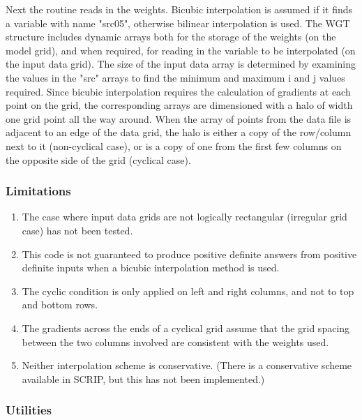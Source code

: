 \documentclass[../main/NEMO_manual]{subfiles}
\begin{document}
Next the routine reads in the weights.
Bicubic interpolation is assumed if it finds a variable with name "src05", otherwise bilinear interpolation is used.
The WGT structure includes dynamic arrays both for the storage of the weights (on the model grid),
and when required, for reading in the variable to be interpolated (on the input data grid).
The size of the input data array is determined by examining the values in the "src" arrays to
find the minimum and maximum i and j values required.
Since bicubic interpolation requires the calculation of gradients at each point on the grid,
the corresponding arrays are dimensioned with a halo of width one grid point all the way around.
When the array of points from the data file is adjacent to an edge of the data grid,
the halo is either a copy of the row/column next to it (non-cyclical case),
or is a copy of one from the first few columns on the opposite side of the grid (cyclical case).

\subsubsection{Limitations}
\label{subsec:SBC_iof_lim}

\begin{enumerate}
\item The case where input data grids are not logically rectangular (irregular grid case) has not been tested.
\item This code is not guaranteed to produce positive definite answers from positive definite inputs when
  a bicubic interpolation method is used.
\item The cyclic condition is only applied on left and right columns, and not to top and bottom rows.
\item The gradients across the ends of a cyclical grid assume that the grid spacing between
  the two columns involved are consistent with the weights used.
\item Neither interpolation scheme is conservative. (There is a conservative scheme available in SCRIP,
  but this has not been implemented.)
\end{enumerate}

\subsubsection{Utilities}
\label{subsec:SBC_iof_util}
\end{document}

